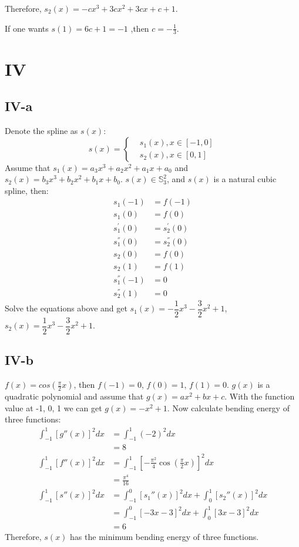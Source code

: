 \documentclass[a4paper]{article}
\begin{document}
Therefore, $s_2(x) = -cx^3+3cx^2+3cx+c+1$.

If one wants $s(1) = 6c+1 = -1$ ,then $c = -\frac{1}{3}$.

\section*{IV}
\subsection*{IV-a}
Denote the spline as $s(x)$:
$$
s(x) = \left\{
\begin{aligned}
& s_1(x), x\in [-1,0] \\
& s_2(x), x\in [0,1]
\end{aligned}
\right.
$$
Assume that $s_1(x) = a_3x^3 + a_2x^2 + a_1x + a_0$ and $s_2(x) = b_3x^3 + b_2x^2 + b_1x + b_0$.
$s(x) \in \mathbb{S}_3^2$, and $s(x)$ is a natural cubic spline, then:
\begin{align*}
s_1(-1) &= f(-1) \\
s_1(0) &= f(0) \\
s_1^{'}(0) &= s_2^{'}(0) \\
s_1^{''}(0) &= s_2^{''}(0) \\
s_2(0) &= f(0) \\
s_2(1) &= f(1) \\
s_1^{''}(-1) &= 0 \\
s_2^{''}(1) &= 0
\end{align*}
Solve the equations above and get $s_1(x) = -\dfrac{1}{2}x^3 - \dfrac{3}{2}x^2 + 1$, $s_2(x) = \dfrac{1}{2}x^3 - \dfrac{3}{2}x^2 + 1$.

\subsection*{IV-b}
$f(x) = cos(\frac{\pi}{2}x)$, then $f(-1) = 0$, $f(0) = 1$, $f(1) = 0$. $g(x)$ is a quadratic polynomial and assume that $g(x) = ax^2+bx+c$. With the function value at -1, 0, 1 we can get 
$g(x) = -x^2+1$. Now calculate bending energy of three functions:
\begin{align*}
\int_{-1}^{1}[g''(x)]^2dx &= \int_{-1}^{1}(-2)^2dx \\
&= 8 \\
\int_{-1}^{1}[f''(x)]^2dx &= \int_{-1}^{1}[-\frac{\pi^2}{4}\cos(\frac{\pi}{2}x)]^2dx \\
&= \frac{\pi^4}{16}\\
\int_{-1}^{1}[s''(x)]^2dx &= \int_{-1}^0[s_1''(x)]^2dx + \int_{0}^1[s_2''(x)]^2dx \\
&= \int_{-1}^0[-3x-3]^2dx + \int_{0}^1[3x-3]^2dx \\
&= 6
\end{align*}
Therefore, $s(x)$ has the minimum bending energy of three functions.
\end{document}

